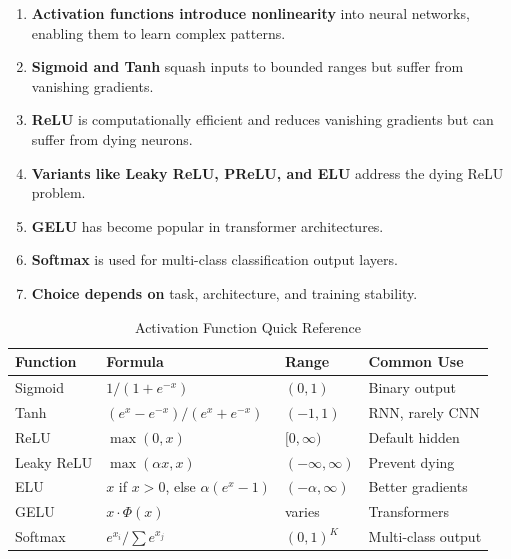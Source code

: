 \begin{enumerate}
    \item \textbf{Activation functions introduce nonlinearity} into neural networks, enabling them to learn complex patterns.
    
    \item \textbf{Sigmoid and Tanh} squash inputs to bounded ranges but suffer from vanishing gradients.
    
    \item \textbf{ReLU} is computationally efficient and reduces vanishing gradients but can suffer from dying neurons.
    
    \item \textbf{Variants like Leaky ReLU, PReLU, and ELU} address the dying ReLU problem.
    
    \item \textbf{GELU} has become popular in transformer architectures.
    
    \item \textbf{Softmax} is used for multi-class classification output layers.
    
    \item \textbf{Choice depends on} task, architecture, and training stability.
\end{enumerate}

\begin{table}[ht]
    \centering
    \caption{Activation Function Quick Reference}
    \begin{tabular}{L{2.5cm} L{2.5cm} L{2cm} L{3cm}}
        \toprule
        \textbf{Function} & \textbf{Formula} & \textbf{Range} & \textbf{Common Use} \\
        \midrule
        Sigmoid & $1/(1+e^{-x})$ & $(0,1)$ & Binary output \\
        Tanh & $(e^x-e^{-x})/(e^x+e^{-x})$ & $(-1,1)$ & RNN, rarely CNN \\
        ReLU & $\max(0,x)$ & $[0,\infty)$ & Default hidden \\
        Leaky ReLU & $\max(\alpha x, x)$ & $(-\infty,\infty)$ & Prevent dying \\
        ELU & $x$ if $x>0$, else $\alpha(e^x-1)$ & $(-\alpha,\infty)$ & Better gradients \\
        GELU & $x \cdot \Phi(x)$ & varies & Transformers \\
        Softmax & $e^{x_i}/\sum e^{x_j}$ & $(0,1)^K$ & Multi-class output \\
        \bottomrule
    \end{tabular}
\end{table}


